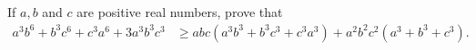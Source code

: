 If ${a, b}$ and $c$ are positive real numbers, prove that
\begin{align*}
 a ^ 3b ^ 6 + b ^ 3c ^ 6 + c ^ 3a ^ 6 + 3a ^ 3b ^ 3c ^ 3 &\ge{ abc \left (a ^ 3b ^ 3 + b ^ 3c ^ 3 + c ^ 3a ^ 3 \right) + a ^ 2b ^ 2c ^ 2 \left (a ^ 3 + b ^ 3 + c ^ 3 \right)}.
\end{align*}
